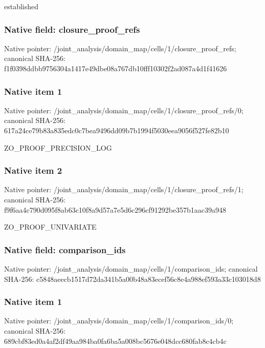 \documentclass[10pt,a4paper]{article}
\begin{document}
\begingroup\raggedright\sloppy established\par\endgroup

\subsubsection{Native field: closure\_\allowbreak{}proof\_\allowbreak{}refs}
Native pointer: /joint\_\allowbreak{}analysis/domain\_\allowbreak{}map/cells/1/closure\_\allowbreak{}proof\_\allowbreak{}refs; canonical SHA-256: f1f0398ddbb9756304a1417e49dbe08a767db10fff10302f2ad087a4d1f41626

\subsubsection{Native item 1}
Native pointer: /joint\_\allowbreak{}analysis/domain\_\allowbreak{}map/cells/1/closure\_\allowbreak{}proof\_\allowbreak{}refs/0; canonical SHA-256: 617a24ce79b83a835edc0c7bea9496dd09b7b1994f5030eea9056f527fe82b10

\begingroup\raggedright\sloppy ZO\_\allowbreak{}PROOF\_\allowbreak{}PRECISION\_\allowbreak{}LOG\par\endgroup

\subsubsection{Native item 2}
Native pointer: /joint\_\allowbreak{}analysis/domain\_\allowbreak{}map/cells/1/closure\_\allowbreak{}proof\_\allowbreak{}refs/1; canonical SHA-256: f9f6aa4c790d095f8ab63c10f8a9d57a7e5d6c296cf91292be357b1aac39a948

\begingroup\raggedright\sloppy ZO\_\allowbreak{}PROOF\_\allowbreak{}UNIVARIATE\par\endgroup

\subsubsection{Native field: comparison\_\allowbreak{}ids}
Native pointer: /joint\_\allowbreak{}analysis/domain\_\allowbreak{}map/cells/1/comparison\_\allowbreak{}ids; canonical SHA-256: c5848aeecb1517d72da341b5a00b48a83ecef56c8e4a988ef593a33c103018d8

\subsubsection{Native item 1}
Native pointer: /joint\_\allowbreak{}analysis/domain\_\allowbreak{}map/cells/1/comparison\_\allowbreak{}ids/0; canonical SHA-256: 689cbf83ed0a4af2df49aa984ba0fa6ba5a008bc5676e048dcc680fab8c4cb4c
\end{document}
